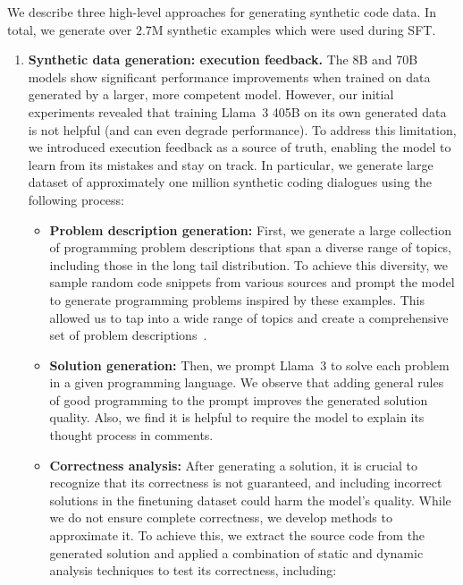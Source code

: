 We describe three high-level approaches for generating synthetic code data. In total, we generate over $2.7$M synthetic examples which were used during SFT.

\begin{enumerate}
    \item{\textbf{Synthetic data generation: execution feedback.}} The 8B and 70B models show significant performance improvements when trained on data generated by a larger, more competent model. However, our initial experiments revealed that training Llama~3 405B on its own generated data is not helpful (and can even degrade performance). To address this limitation, we introduced execution feedback as a source of truth, enabling the model to learn from its mistakes and stay on track. In particular, we generate large dataset of approximately one million synthetic coding dialogues using the following process:

    \begin{itemize}
        \item \textbf{Problem description generation:} First, we generate a large collection of programming problem descriptions that span a diverse range of topics, including those in the long tail distribution. To achieve this diversity, we sample random code snippets from various sources and prompt the model to generate programming problems inspired by these examples. This allowed us to tap into a wide range of topics and create a comprehensive set of problem descriptions~\citep{wei2024magicoderempoweringcodegeneration}.

        \item \textbf{Solution generation:} Then, we prompt Llama~3 to solve each problem in a given programming language. We observe that adding general rules of good programming to the prompt improves the generated solution quality. Also, we find it is helpful to require the model to explain its thought process in comments.

        \item \textbf{Correctness analysis:} After generating a solution, it is crucial to recognize that its correctness is not guaranteed, and including incorrect solutions in the finetuning dataset could harm the model's quality. While we do not ensure complete correctness, we develop methods to approximate it. To achieve this, we extract the source code from the generated solution and applied a combination of static and dynamic analysis techniques to test its correctness, including:


\end{itemize}
\end{enumerate}
